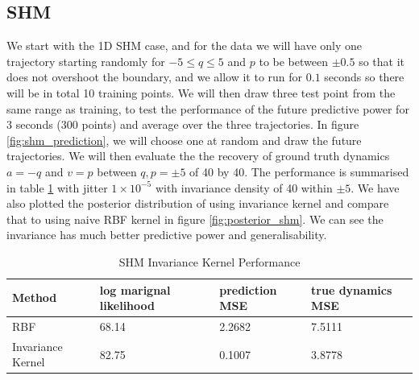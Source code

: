 \documentclass{statsmsc}
\begin{document}
\subsection{SHM}
We start with the 1D SHM case, and for the data we will have only one trajectory starting randomly for $-5\le q\le5$ and $p$ to be between $\pm 0.5$ so that it does not overshoot the boundary, and we allow it to run for $0.1$ seconds so there will be in total 10 training points. 
We will then draw three test point from the same range as training, to test the performance of the future predictive power for 3 seconds (300 points) and average over the three trajectories. 
In figure \ref{fig:shm_prediction}, we will choose one at random and draw the future trajectories.
We will then evaluate the the recovery of ground truth dynamics $a=-q$ and $v=p$ between $q, p=\pm 5$ of 40 by 40.
The performance is summarised in table \ref{tab:shm_performance} with jitter $1\times 10^{-5}$ with invariance density of 40 within $\pm 5$. 
We have also plotted the posterior distribution of using invariance kernel and compare that to using naive RBF kernel in figure \ref{fig:posterior_shm}.
We can see the invariance has much better predictive power and generalisability.
\begin{table}[H]
  \centering
  \begin{tabular}{l l l l }
\hline
Method           & log marignal likelihood & prediction MSE &  true dynamics  MSE\\
                    \hline
RBF & 68.14 & 2.2682 & 7.5111 \\
Invariance Kernel & 82.75 & 0.1007 & 3.8778 \\
\hline
  \end{tabular}
  \caption{SHM Invariance Kernel Performance}
  \label{tab:shm_performance}
\end{table}
\end{document}
